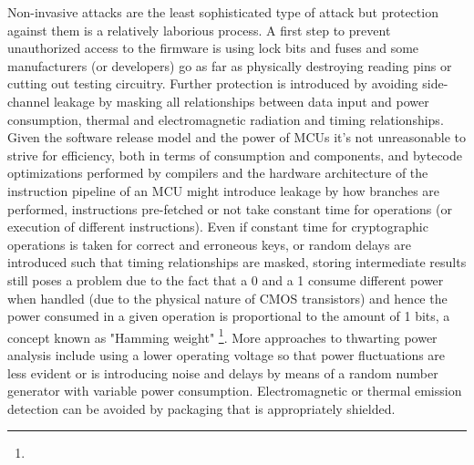 Non-invasive attacks are the least sophisticated type of attack but protection against them is a relatively laborious process\citep{anderson:cautionary_note}. A first step to prevent unauthorized access to the firmware is using lock bits and fuses\citep{atmega_manual}\citep{tech:avrfreaks} and some manufacturers (or developers) go as far as physically destroying reading pins or cutting out testing circuitry\citep{sergei:thesis}. Further protection is introduced by avoiding side-channel leakage by masking all relationships between data input and power consumption, thermal and electromagnetic radiation and timing relationships\citep{kocher:DPA}\cite{sergei:thesis}. Given the software release model and the power of MCUs it's not unreasonable to strive for efficiency, both in terms of consumption and components, and bytecode optimizations performed by compilers and the hardware architecture of the instruction pipeline of an MCU might introduce leakage \citep{kocher:DPA}\citep{sergei:thesis} by how branches are performed, instructions pre-fetched or not take constant time for operations (or execution of different instructions). Even if constant time for cryptographic operations is taken for correct and erroneous keys, or random delays are introduced such that timing relationships are masked, storing intermediate results still poses a problem due to the fact that a 0 and a 1 consume different power when handled (due to the physical nature of CMOS transistors) and hence the power consumed in a given operation is proportional to the amount of 1 bits, a concept known as "Hamming weight" \citep{website:riscure}\citep{kocher:DPA}\footnote{}. More approaches to thwarting power analysis include using a lower operating voltage so that power fluctuations are less evident or is introducing noise and delays by means of a random number generator with variable power consumption\citep{kocher:DPA}\citep{hwre}\citep{avr_mega}. Electromagnetic or thermal emission detection can be avoided by packaging that is appropriately shielded\citep{website:ibm_secure}\citep{kocher:DPA}. 


